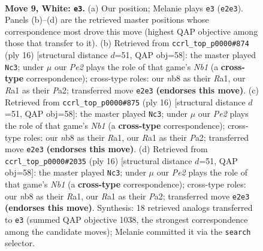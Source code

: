 \documentclass[11pt]{article}
\begin{document}
\clearpage

\begin{figure}[p]\centering
\begin{subfigure}{0.46\textwidth}\centering
\resizebox{\linewidth}{!}{%
\newchessgame
\chessboard[
  setfen={rnbq1rk1/ppp1bp1p/4p1p1/3n4/2NP4/6P1/PP2PPBP/RNBQ1RK1 w - - 0 9},
  showmover=false,
  pgfstyle=straightmove, color=movearrow, markmove={e2-e3}
]}
\caption{}
\end{subfigure}\hfill
\begin{subfigure}{0.46\textwidth}\centering
\resizebox{\linewidth}{!}{%
\newchessgame
\chessboard[
  setfen={rnbq1rk1/pp2ppbp/6p1/3n4/3N4/6P1/PP2PPBP/RNBQ1RK1 w - - 0 9},
  showmover=false,
  pgfstyle=straightmove, color=movearrow, markmove={b1-c3}
]}
\caption{}
\end{subfigure}
\\[4pt]
\begin{subfigure}{0.46\textwidth}\centering
\resizebox{\linewidth}{!}{%
\newchessgame
\chessboard[
  setfen={rnbq1rk1/pp2ppbp/6p1/3n4/3N4/6P1/PP2PPBP/RNBQ1RK1 w - - 0 9},
  showmover=false,
  pgfstyle=straightmove, color=movearrow, markmove={b1-c3}
]}
\caption{}
\end{subfigure}\hfill
\begin{subfigure}{0.46\textwidth}\centering
\resizebox{\linewidth}{!}{%
\newchessgame
\chessboard[
  setfen={rnbq1rk1/pp2ppbp/6p1/3n4/3N4/6P1/PP2PPBP/RNBQ1RK1 w - - 0 9},
  showmover=false,
  pgfstyle=straightmove, color=movearrow, markmove={b1-c3}
]}
\caption{}
\end{subfigure}
\caption{\textbf{Move 9, White: \texttt{e3}.} (a) Our position; Melanie plays \texttt{e3} (\texttt{e2e3}). Panels (b)--(d) are the retrieved master positions whose correspondence most drove this move (highest QAP objective among those that transfer to it). (b) Retrieved from \texttt{ccrl\_top\_p0000\#874} (ply 16) [structural distance $d$=51, QAP obj=58]: the master played \texttt{Nc3}; under $\mu$ our \emph{Pe2} plays the role of that game's \emph{Nb1} (a \textbf{cross-type} correspondence); cross-type roles: our \emph{n}b8 as their \emph{R}a1, our \emph{R}a1 as their \emph{P}a2; transferred move \texttt{e2e3} \textbf{(endorses this move)}. (c) Retrieved from \texttt{ccrl\_top\_p0000\#875} (ply 16) [structural distance $d$=51, QAP obj=58]: the master played \texttt{Nc3}; under $\mu$ our \emph{Pe2} plays the role of that game's \emph{Nb1} (a \textbf{cross-type} correspondence); cross-type roles: our \emph{n}b8 as their \emph{R}a1, our \emph{R}a1 as their \emph{P}a2; transferred move \texttt{e2e3} \textbf{(endorses this move)}. (d) Retrieved from \texttt{ccrl\_top\_p0000\#2035} (ply 16) [structural distance $d$=51, QAP obj=58]: the master played \texttt{Nc3}; under $\mu$ our \emph{Pe2} plays the role of that game's \emph{Nb1} (a \textbf{cross-type} correspondence); cross-type roles: our \emph{n}b8 as their \emph{R}a1, our \emph{R}a1 as their \emph{P}a2; transferred move \texttt{e2e3} \textbf{(endorses this move)}. Synthesis: 18 retrieved analogs transferred to \texttt{e3} (summed QAP objective 1038, the strongest correspondence among the candidate moves); Melanie committed it via the \texttt{search} selector.}
\label{fig:thought-m16}
\end{figure}
\end{document}
